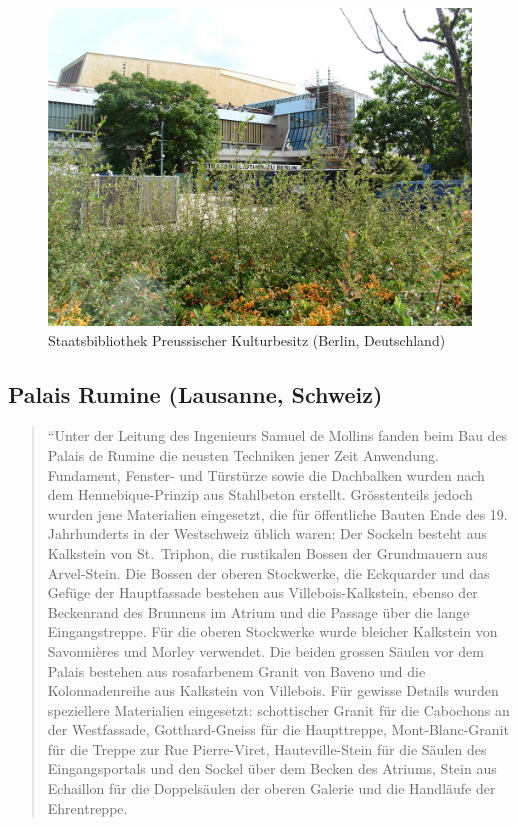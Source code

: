 \documentclass[a4paper,
fontsize=11pt,
oneside,
numbers=noperiodatend,
parskip=half-,
bibliography=totoc,
final
]{scrartcl}
\begin{document}
\begin{figure}[htbp]
\centering
\includegraphics{./img/013.jpg}
\caption{Staatsbibliothek Preussischer Kulturbesitz (Berlin,
Deutschland)}
\end{figure}

\subsection*{Palais Rumine (Lausanne,
Schweiz)}\label{palais-rumine-lausanne-schweiz}

\begin{quote}
``Unter der Leitung des Ingenieurs Samuel de Mollins fanden beim Bau des
Palais de Rumine die neusten Techniken jener Zeit Anwendung. Fundament,
Fenster- und Türstürze sowie die Dachbalken wurden nach dem
Hennebique-Prinzip aus Stahlbeton erstellt. Grösstenteils jedoch wurden
jene Materialien eingesetzt, die für öffentliche Bauten Ende des 19.
Jahrhunderts in der Westschweiz üblich waren: Der Sockeln besteht aus
Kalkstein von St.~Triphon, die rustikalen Bossen der Grundmauern aus
Arvel-Stein. Die Bossen der oberen Stockwerke, die Eckquarder und das
Gefüge der Hauptfassade bestehen aus Villebois-Kalkstein, ebenso der
Beckenrand des Brunnens im Atrium und die Passage über die lange
Eingangstreppe. Für die oberen Stockwerke wurde bleicher Kalkstein von
Savonnières und Morley verwendet. Die beiden grossen Säulen vor dem
Palais bestehen aus rosafarbenem Granit von Baveno und die
Kolonnadenreihe aus Kalkstein von Villebois. Für gewisse Details wurden
speziellere Materialien eingesetzt: schottischer Granit für die
Cabochons an der Westfassade, Gotthard-Gneiss für die Haupttreppe,
Mont-Blanc-Granit für die Treppe zur Rue Pierre-Viret, Hauteville-Stein
für die Säulen des Eingangsportals und den Sockel über dem Becken des
Atriums, Stein aus Echaillon für die Doppelsäulen der oberen Galerie und
die Handläufe der Ehrentreppe.
\end{quote}
\end{document}
